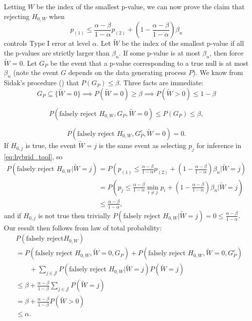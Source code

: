 \documentclass{article}
\begin{document}
\begin{appendix}
Letting $W$ be the index of the smallest p-value, we can now prove the claim that rejecting $H_{0, W}$ when 
\begin{equation*}
    p_{(1)} \leq \frac{\alpha-\beta}{1-\alpha} p_{(2)} + \left(1 - \frac{\alpha-\beta}{1-\alpha} \right) \beta_n 
\end{equation*}
controls Type I error at level $\alpha$. Let $\widetilde{W}$ be the index of the smallest p-value if all the p-values are strictly larger than $\beta_n$. If some p-value is at most $\beta_n$, then force $\widetilde{W}=0$. Let $G_P$ be the event that a p-value corresponding to a true null is at most $\beta_n$ (note the event $G$ depends on the data generating process $P$). We know from Sidak's procedure () that $P(G_P) \leq \beta$. Three facts are immediate: 
\begin{equation*}
    G_P \subseteq \{\widetilde{W} = 0 \} \implies P(\widetilde{W} = 0) \geq \beta \implies P(\widetilde{W} > 0) \leq 1-\beta 
\end{equation*}

\begin{equation*}
    P(\text{falsely reject } H_{0, W}, G_P, \widetilde{W} = 0) \leq P(G_P) \leq \beta,
\end{equation*}

\begin{equation*}
    P(\text{falsely reject } H_{0, W}, G^c_P, \widetilde{W} = 0) = 0. 
\end{equation*}
If $H_{0, j}$ is true, the event $\widetilde{W} = j$ is the same event as selecting $p_j$ for inference in \eqref{eq:hybrid_tool}, so 
\begin{align*}
    P(\text{falsely reject } H_{0, W} | \widetilde{W} = j) &= P\left(p_{(1)} \leq \frac{\alpha-\beta}{1-\alpha} p_{(2)} + \left(1 - \frac{\alpha-\beta}{1-\alpha} \right) \beta_n | \widetilde{W} = j\right)\\
    &=  P\left(p_j \leq \frac{\alpha-\beta}{1-\alpha} \min_{i \neq j}p_i + \left(1 - \frac{\alpha-\beta}{1-\alpha} \right) \beta_n | \widetilde{W} = j\right)\\
    &\leq \frac{\alpha - \beta}{1-\alpha},
\end{align*}
and if $H_{0, j}$ is not true then trivially $P(\text{falsely reject } H_{0, W} | \widetilde{W} = j) = 0 \leq \frac{\alpha - \beta}{1-\alpha}$. Our result then follows from law of total probability:
\begin{align*}
    &P(\text{falsely reject} H_{0, W} )\\
    &= P(\text{falsely reject } H_{0, W}, \widetilde{W} = 0, G_P) + P(\text{falsely reject } H_{0, W}, \widetilde{W} = 0, G_P^c) \\
    &\qquad + \sum_{j \in \mathcal{J}}P(\text{falsely reject } H_{0, W} | \widetilde{W} = j ) P(\widetilde{W} = j)\\
    &\leq \beta + \frac{\alpha - \beta}{1-\beta} \sum_{j \in \mathcal{J}} P(\widetilde{W} = j)\\
    &= \beta + \frac{\alpha - \beta}{1-\beta} P(\widetilde{W} > 0)\\
    &\leq \alpha. 
\end{align*}


\end{appendix}
\end{document}
